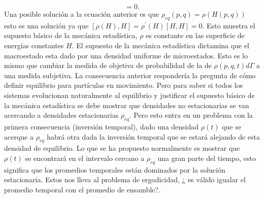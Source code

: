 \begin{equation}
[\rho_{eq}, H]=0.
\end{equation}
Una posible solución a la ecuación anterior es que $\rho_{eq}(p,q)=\rho(H(p,q))$ esto es una solución ya que $[\rho(H),H]=\rho^{'}(H)[H,H]=0$. Esto muestra el supuesto básico de la mecánica estadística, $\rho$ es constante en las superficie de energías constantes $H$. El supuesto de la mecánica estadística dictamina que el macroestado esta dado por una densidad uniforme de microestados. Esto es lo mismo que cambiar la medida de objetiva de probabilidad de la de $\rho(p,q,t) d\Gamma$ a una medida subjetiva.
La consecuencia anterior respondería la pregunta de cómo definir equilibrio para partículas en movimiento. Pero para saber si todos los sistemas evolucionan naturalmente al equilibrio  y justificar el supuesto básico de la mecánica estadística se debe mostrar que densidades no estacionarias se van acercando a densidades estacionarias $\rho_{eq}$. Pero esto entra en un problema con la primera consecuencia (inversión temporal), dado una densidad $\rho(t)$ que se acerque a $\rho_{eq}$ habrá otra dada la inversión temporal que se estará alejando de esta densidad de equilibrio. Lo que se ha propuesto normalmente es mostrar que $\rho(t)$ se encontrará en el intervalo cercano a $\rho_{eq}$ una gran parte del tiempo, esto significa que los promedios temporales están dominados por la solución estacionaria. Estos nos lleva al problema de ergodicidad, ¿ es válido igualar el promedio temporal con el promedio de ensamble?.

